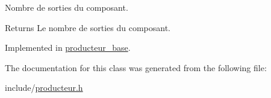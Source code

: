 Nombre de sorties du composant. 

\begin{DoxyReturn}{Returns}
Le nombre de sorties du composant. 
\end{DoxyReturn}


Implemented in \hyperlink{classproducteur__base_ae5148ef791b0f3c393e45e08e08c6246}{producteur\-\_\-base}.



The documentation for this class was generated from the following file\-:\begin{DoxyCompactItemize}
\item 
include/\hyperlink{producteur_8h}{producteur.\-h}\end{DoxyCompactItemize}
